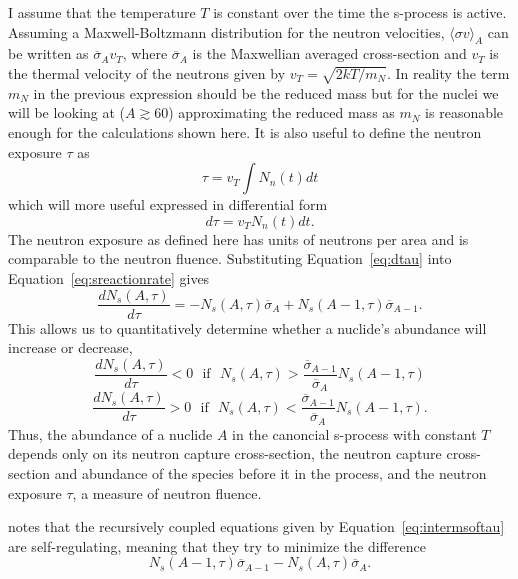 I assume that the temperature $T$ is constant over the time the
s-process is active.  Assuming a Maxwell-Boltzmann distribution 
for the neutron velocities, 
$\langle \sigma v \rangle_A$ can be written as
$ \overline{\sigma}_A v_T$, where $ \overline{\sigma}_A$ is the
Maxwellian averaged cross-section and $v_T$ is the thermal velocity of
the neutrons given by $v_T = \sqrt{2kT/m_N}$.  In reality the term
$m_N$ in the previous expression should be the reduced mass but for the
nuclei we will be looking at ($A \gtrsim 60$) approximating the
reduced mass as $m_N$ is reasonable enough for the calculations shown
here.  It is also useful to define the neutron exposure $\tau$ as
\begin{equation}
\tau = v_T \int N_n(t)dt
\end{equation}
which will more useful expressed in differential form
\begin{equation}
\label{eq:dtau}
d\tau = v_TN_n(t)dt.
\end{equation}
The neutron exposure as defined here has units of neutrons per area
and is comparable to the neutron fluence.  Substituting
Equation~\ref{eq:dtau} into Equation~\ref{eq:sreactionrate} gives
\begin{equation}
\label{eq:intermsoftau}
\frac{dN_s(A,\tau)}{d\tau} = -N_s(A,\tau)\overline{\sigma}_A +
N_s(A-1,\tau)\overline{\sigma}_{A-1}.
\end{equation}
This allows us to quantitatively determine whether a nuclide's
abundance will increase or decrease,
\begin{equation*}
\frac{dN_s(A,\tau)}{d\tau} < 0 ~~~\textrm{if}~~~ N_s(A,\tau)
> \frac{\overline{\sigma}_{A-1}}{\overline{\sigma}_{A}}N_s(A-1,\tau) 
\end{equation*}
\begin{equation}
\frac{dN_s(A,\tau)}{d\tau} > 0 ~~~\textrm{if}~~~ N_s(A,\tau)
< \frac{\overline{\sigma}_{A-1}}{\overline{\sigma}_{A}}N_s(A-1,\tau).
\end{equation}
Thus, the abundance of a nuclide $A$ in the canoncial s-process with
constant $T$ depends only on its neutron capture cross-section, the
neutron capture cross-section and abundance of the species before it 
in the process, and the neutron exposure $\tau$, a measure of neutron
fluence.

\cite{iliadis2008} notes that the recursively coupled equations given
by Equation~\ref{eq:intermsoftau} are self-regulating, meaning that
they try to minimize the difference
\begin{equation}
N_s(A-1,\tau)\overline{\sigma}_{A-1} -
N_s(A,\tau)\overline{\sigma}_{A}.  
\end{equation}

